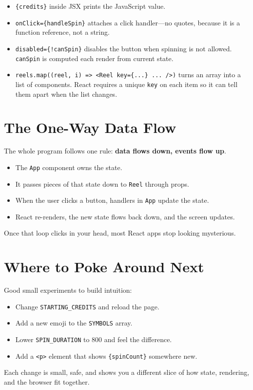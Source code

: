 \documentclass[11pt]{article}
\begin{document}
\begin{itemize}
  \item \texttt{\{credits\}} inside JSX prints the JavaScript value.
  \item \texttt{onClick=\{handleSpin\}} attaches a click handler---no quotes, because it is a function reference, not a string.
  \item \texttt{disabled=\{!canSpin\}} disables the button when spinning is not allowed. \texttt{canSpin} is computed each render from current state.
  \item \texttt{reels.map((reel, i) => <Reel key=\{...\} ... />)} turns an array into a list of components. React requires a unique \texttt{key} on each item so it can tell them apart when the list changes.
\end{itemize}

\section{The One-Way Data Flow}

The whole program follows one rule: \textbf{data flows down, events flow up}.

\begin{itemize}
  \item The \texttt{App} component owns the state.
  \item It passes pieces of that state down to \texttt{Reel} through props.
  \item When the user clicks a button, handlers in \texttt{App} update the state.
  \item React re-renders, the new state flows back down, and the screen updates.
\end{itemize}

Once that loop clicks in your head, most React apps stop looking mysterious.

\section{Where to Poke Around Next}

Good small experiments to build intuition:

\begin{itemize}
  \item Change \texttt{STARTING\_CREDITS} and reload the page.
  \item Add a new emoji to the \texttt{SYMBOLS} array.
  \item Lower \texttt{SPIN\_DURATION} to 800 and feel the difference.
  \item Add a \texttt{<p>} element that shows \texttt{\{spinCount\}} somewhere new.
\end{itemize}

Each change is small, safe, and shows you a different slice of how state,
rendering, and the browser fit together.
\end{document}
